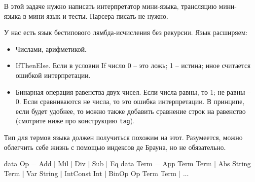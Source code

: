 \documentclass[a4paper,14pt]{article}
\def\hsinline{\lstinline[language=haskell]}
\begin{document}
В этой задаче нужно написать интерпретатор мини-языка, трансляцию мини-языка в мини-язык и тесты. Парсера писать не нужно.

У нас есть язык бестипового лямбда-исчисления без рекурсии.  Язык расширяем:
\begin{itemize}
 \item Числами, арифметикой.
 \item IfThenElse. Если в условии If число 0 -- это ложь; 1 -- истина; иное считается ошибкой интерпретации.
 \item Бинарная операция равенства двух чисел. Если числа равны, то 1; не равны -- 0. Если сравниваются не числа, то это ошибка интерпретации. В принципе, если будет удобнее, то можно также добавить сравнение строк на равенство (смотрите ниже про конструкцию \hsinline=tag=).
\end{itemize}
Тип для термов языка должен получиться похожим на этот. Разумеется, можно облегчить себе жизнь с помощью индексов де Брауна, но не обязательно.
\begin{hslisting}
data Op = Add | Mil | Div | Sub | Eq
data Term = App Term   Term
          | Abs String Term
          | Var String
          | IntConst Int 
          | BinOp Op Term Term      
          | ...
\end{hslisting}
\end{document}
